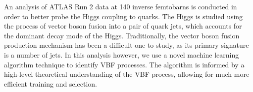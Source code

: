 \documentclass[paper=a4,fontsize=12pt]{article}
\begin{document}
An analysis of ATLAS Run 2 data at 140 inverse femtobarns is conducted in order to better probe the Higgs coupling to quarks. The Higgs is studied using the process of vector boson fusion into a pair of quark jets, which accounts for the dominant decay mode of the Higgs. Traditionally, the vector boson fusion production mechanism has been a difficult one to study, as its primary signature is a number of jets. In this analysis however, we use a novel machine learning algorithm technique to identify VBF processes. The algorithm is informed by a high-level theoretical understanding of the VBF process, allowing for much more efficient training and selection.
\end{document}
